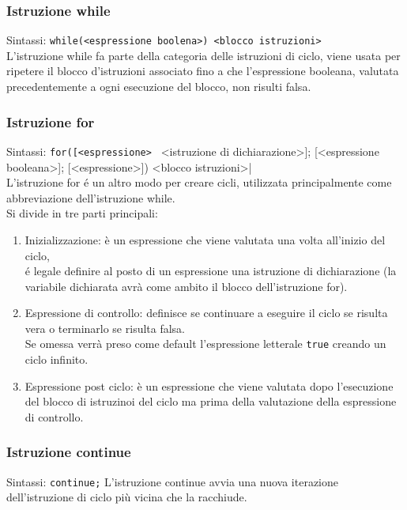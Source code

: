\subsubsection{Istruzione while}
Sintassi: \verb|while(<espressione boolena>) <blocco istruzioni>| \\
L'istruzione while fa parte della categoria delle istruzioni di ciclo, viene usata per ripetere
il blocco d'istruzioni associato fino a che l'espressione booleana, valutata precedentemente a ogni 
esecuzione del blocco, non risulti falsa.

\subsubsection{Istruzione for}
Sintassi: \verb|for([<espressione> | <istruzione di dichiarazione>]; [<espressione booleana>]; [<espressione>]) <blocco istruzioni>| \\
L'istruzione for é un altro modo per creare cicli, utilizzata principalmente come abbreviazione
dell'istruzione while. \\
Si divide in tre parti principali:
\begin{enumerate}
    \item {
        Inizializzazione: è un espressione che viene valutata una volta all'inizio del ciclo, \\
        é legale definire al posto di un espressione una istruzione di dichiarazione
        (la variabile dichiarata avrà come ambito il blocco dell'istruzione for).
    }
    \item { 
        Espressione di controllo: definisce se continuare a eseguire il ciclo se risulta vera 
        o terminarlo se risulta falsa. \\
        Se omessa verrà preso come default l'espressione letterale \verb|true| creando un ciclo infinito.
    }
    \item {
        Espressione post ciclo: è un espressione che viene valutata dopo l'esecuzione del blocco di istruzinoi 
        del ciclo ma prima della valutazione della espressione di controllo.
    }
\end{enumerate}

\subsubsection{Istruzione continue}
Sintassi: \verb|continue;|
L'istruzione continue avvia una nuova iterazione dell'istruzione di ciclo più vicina che la racchiude.

